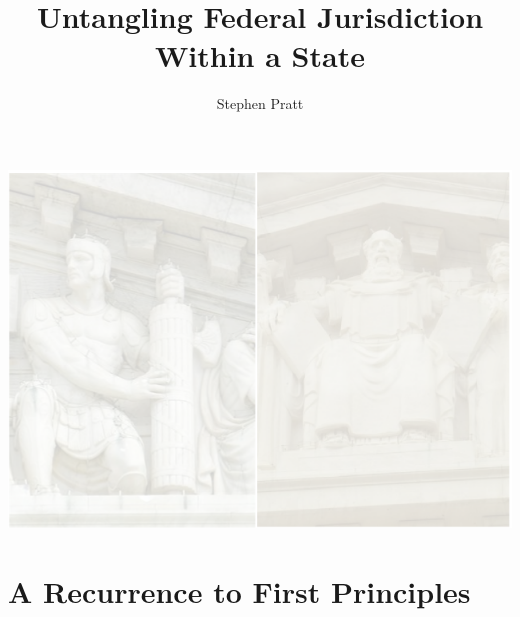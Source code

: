 



\usebackgroundtemplate%
{%
    \includegraphics[width=\paperwidth,height=\paperheight]{img/supcourt-facade-background.png}%
}



\title[Untangling Federal Jurisdiction]{Untangling Federal Jurisdiction Within a State}
\author{Stephen Pratt}

\frame{\titlepage}

\section{A Recurrence to First Principles}

\frame{\mysectionpage}


